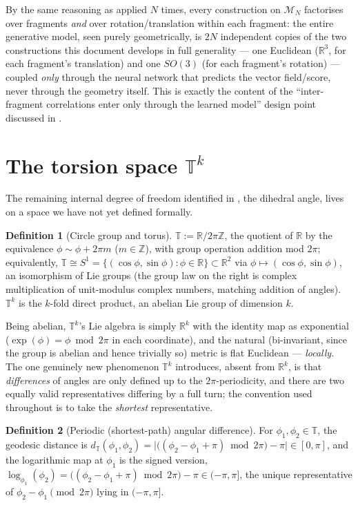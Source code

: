 \documentclass[11pt,a4paper]{report}
\theoremstyle{definition}
\newtheorem{definition}[definition]{Definition}
\theoremstyle{remark}
\newcommand{\RR}{\mathbb R}
\newcommand{\ZZ}{\mathbb Z}
\begin{document}
By the same reasoning as  applied $N$ times, every
construction on $\mathcal M_N$ factorises over fragments \emph{and} over
rotation/translation within each fragment: the entire generative model,
seen purely geometrically, is $2N$ independent copies of the two
constructions this document develops in full generality --- one Euclidean
($\RR^3$, for each fragment's translation) and one $SO(3)$ (for each
fragment's rotation) --- coupled \emph{only} through the neural network that
predicts the vector field/score, never through the geometry itself. This is
exactly the content of the ``inter-fragment correlations enter only through
the learned model'' design point discussed in
.

\section{The torsion space $\mathbb T^k$}
\label{sec:torus}

The remaining internal degree of freedom identified in
, the dihedral angle, lives on a space we have not yet
defined formally.

\begin{definition}[Circle group and torus]
\label{def:torus}
$\mathbb T := \RR/2\pi\ZZ$, the quotient of $\RR$ by the equivalence
$\phi\sim\phi+2\pi m$ ($m\in\ZZ$), with group operation addition mod $2\pi$;
equivalently, $\mathbb T\cong S^1=\{(\cos\phi,\sin\phi):\phi\in\RR\}\subset\RR^2$
via $\phi\mapsto(\cos\phi,\sin\phi)$, an isomorphism of Lie groups (the
group law on the right is complex multiplication of unit-modulus complex
numbers, matching addition of angles). $\mathbb T^k$ is the $k$-fold direct
product, an abelian Lie group of dimension $k$.
\end{definition}

Being abelian, $\mathbb T^k$'s Lie algebra is simply $\RR^k$ with the
identity map as exponential ($\exp(\phi)=\phi\bmod2\pi$ in each coordinate),
and the natural (bi-invariant, since the group is abelian and hence trivially
so) metric is flat Euclidean --- \emph{locally}. The one genuinely new
phenomenon $\mathbb T^k$ introduces, absent from $\RR^k$, is that
\emph{differences} of angles are only defined up to the $2\pi$-periodicity,
and there are two equally valid representatives differing by a full turn;
the convention used throughout is to take the \emph{shortest} representative.

\begin{definition}[Periodic (shortest-path) angular difference]
\label{def:angular-diff}
For $\phi_1,\phi_2\in\mathbb T$, the geodesic distance is
$d_{\mathbb T}(\phi_1,\phi_2) = \bigl|\bigl((\phi_2-\phi_1+\pi)\bmod2\pi\bigr)-\pi\bigr|\in[0,\pi]$,
and the logarithmic map at $\phi_1$ is the signed version,
$\log_{\phi_1}(\phi_2) = \bigl((\phi_2-\phi_1+\pi)\bmod2\pi\bigr)-\pi \in(-\pi,\pi]$,
the unique representative of $\phi_2-\phi_1\pmod{2\pi}$ lying in $(-\pi,\pi]$.
\end{definition}
\end{document}
